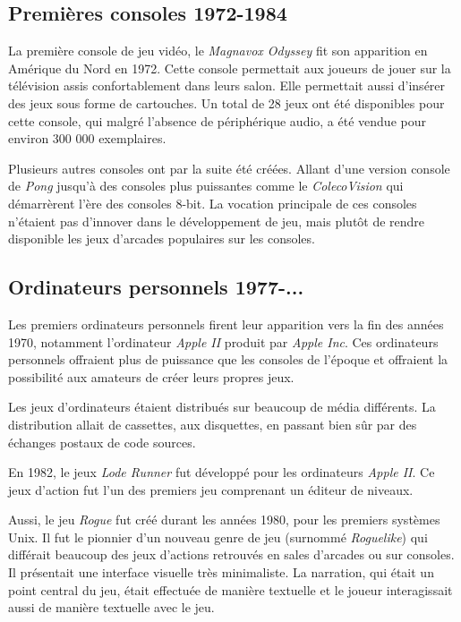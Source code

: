 \documentclass[12pt,twoside,letterpaper,francais]{book}
\newcommand{\lr}{{\textit{Lode Runner }}}
\begin{document}
\FloatBarrier
\subsection{Premières consoles 1972-1984}
La première console de jeu vidéo, le \textit{Magnavox Odyssey} fit son
apparition en Amérique du Nord en 1972. Cette console permettait aux
joueurs de jouer sur la télévision assis confortablement dans leurs
salon. Elle permettait aussi d'insérer des jeux sous forme de
cartouches. Un total de 28 jeux ont été disponibles pour cette
console, qui malgré l'absence de périphérique audio, a été vendue pour
environ 300 000 exemplaires.

Plusieurs autres consoles ont par la suite été créées. Allant d'une
version console de \textit{Pong} jusqu'à des consoles plus puissantes
comme le \textit{ColecoVision} qui démarrèrent l'ère des consoles
8-bit. La vocation principale de ces consoles n'étaient pas d'innover
dans le développement de jeu, mais plutôt de rendre disponible les
jeux d'arcades populaires sur les consoles.


\FloatBarrier
\subsection{Ordinateurs personnels 1977-...}
Les premiers ordinateurs personnels firent leur apparition vers la
fin des années 1970, notamment l'ordinateur \textit{Apple II}
produit par \textit{Apple Inc}. Ces ordinateurs personnels offraient
plus de puissance que les consoles de l'époque et offraient la
possibilité aux amateurs de créer leurs propres jeux.

Les jeux d'ordinateurs étaient distribués sur beaucoup de média
différents. La distribution allait de cassettes, aux disquettes, en
passant bien sûr par des échanges postaux de code sources.

En 1982, le jeux \lr fut développé pour les
ordinateurs \textit{Apple II}. Ce jeux d'action fut l'un des premiers
jeu comprenant un éditeur de niveaux.

Aussi, le jeu \textit{Rogue} fut créé durant les années 1980, pour les
premiers systèmes Unix. Il fut le pionnier d'un nouveau genre de jeu
(surnommé \textit{Roguelike}) qui différait beaucoup des jeux
d'actions retrouvés en sales d'arcades ou sur consoles. Il présentait
une interface visuelle très minimaliste. La narration, qui était un
point central du jeu, était effectuée de manière textuelle et le
joueur interagissait aussi de manière textuelle avec le jeu.
\end{document}
